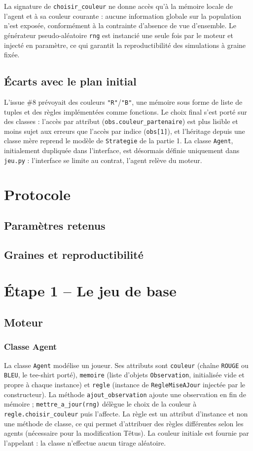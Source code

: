 \documentclass[11pt,a4paper]{article}
\begin{document}
La signature de \texttt{choisir\_couleur} ne donne accès qu'à la mémoire locale de l'agent et à sa couleur courante : aucune
information globale sur la population n'est exposée, conformément à la contrainte d'absence de vue d'ensemble. Le générateur
pseudo-aléatoire \texttt{rng} est instancié une seule fois par le moteur et injecté en paramètre, ce qui garantit la
reproductibilité des simulations à graine fixée.

\subsection{Écarts avec le plan initial}
L'issue \#8 prévoyait des couleurs \texttt{"R"}/\texttt{"B"}, une mémoire sous forme de liste de tuples et des règles
implémentées comme fonctions. Le choix final s'est porté sur des classes : l'accès par attribut
(\texttt{obs.couleur\_partenaire}) est plus lisible et moins sujet aux erreurs que l'accès par indice (\texttt{obs[1]}), et
l'héritage depuis une classe mère reprend le modèle de \texttt{Strategie} de la partie 1. La classe \texttt{Agent}, initialement
dupliquée dans l'interface, est désormais définie uniquement dans \texttt{jeu.py} : l'interface se limite au contrat, l'agent
relève du moteur.

\section{Protocole}
\subsection{Paramètres retenus}
\subsection{Graines et reproductibilité}

\section{Étape 1 -- Le jeu de base}
\subsection{Moteur}
\subsubsection{Classe Agent}
La classe \texttt{Agent} modélise un joueur. Ses attributs sont \texttt{couleur} (chaîne \texttt{ROUGE} ou \texttt{BLEU},
le tee-shirt porté), \texttt{memoire} (liste d'objets \texttt{Observation}, initialisée vide et propre à chaque instance) et
\texttt{regle} (instance de \texttt{RegleMiseAJour} injectée par le constructeur). La méthode \texttt{ajout\_observation} ajoute une
observation en fin de mémoire ; \texttt{mettre\_a\_jour(rng)} délègue le choix de la couleur à \texttt{regle.choisir\_couleur} puis
l'affecte. La règle est un attribut d'instance et non une méthode de classe, ce qui permet d'attribuer des règles différentes
selon les agents (nécessaire pour la modification Têtus). La couleur initiale est fournie par l'appelant : la classe n'effectue
aucun tirage aléatoire.
\end{document}
